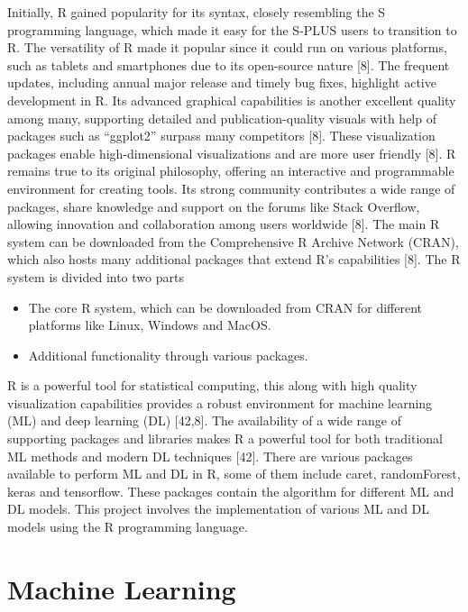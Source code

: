 \documentclass[12pt,a4paper]{report}
\begin{document}
Initially, R gained popularity for its syntax, closely resembling the S programming language, which made it easy for the S-PLUS users to transition to R. The versatility of R made it popular since it could run on various platforms, such as tablets and smartphones due to its open-source nature [8]. 
The frequent updates, including annual major release and timely bug fixes, highlight active development in R. Its advanced graphical capabilities is another excellent quality among many, supporting detailed and publication-quality visuals with help of packages such as “ggplot2” surpass many competitors [8].
These visualization packages enable high-dimensional visualizations and are more user friendly [8]. R remains true to its original philosophy, offering an interactive and programmable environment for creating tools. Its strong community contributes a wide range of packages, share knowledge and support on the 
forums like Stack Overflow, allowing innovation and collaboration among users worldwide [8]. The main R system can be downloaded from the Comprehensive R Archive Network (CRAN), which also hosts many additional packages that extend R’s capabilities [8]. The R system is divided into two parts \\

\begin{itemize}
    \item The core R system, which can be downloaded from CRAN for different platforms like Linux, Windows and MacOS.
    \item Additional functionality through various packages.
\end{itemize}

R is a powerful tool for statistical computing, this along with high quality visualization capabilities provides a robust environment for machine learning (ML) and deep learning (DL) [42,8]. The availability of a wide range of supporting packages and libraries makes R a powerful tool for both traditional ML methods and modern DL techniques [42]. There are various packages available to perform ML and DL in R, some of them include caret, randomForest, keras and tensorflow. These packages contain the algorithm for different  ML and DL models. This project involves the implementation of various ML and DL models using the R programming language. \\

\section{Machine Learning}
\end{document}
